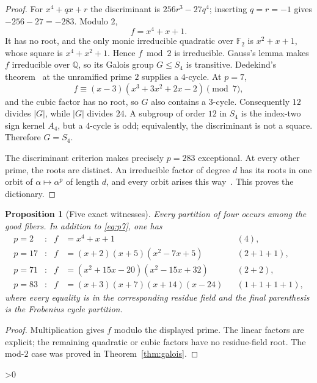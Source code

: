 \documentclass[10pt]{article}
\providecommand{\CRevisionRound}{2}
\newtheorem{proposition}{Proposition}
\begin{document}
\begin{proof}
For $x^4+qx+r$ the discriminant is $256r^3-27q^4$; inserting $q=r=-1$
gives $-256-27=-283$.  Modulo $2$,
\[
 f=x^4+x+1.
\]
It has no root, and the only monic irreducible quadratic over $\mathbb F_2$
is $x^2+x+1$, whose square is $x^4+x^2+1$.  Hence $f\bmod2$ is
irreducible.  Gauss's lemma makes $f$ irreducible over $\mathbb Q$, so its
Galois group $G\le S_4$ is transitive.  Dedekind's theorem~\cite{Serre,Neukirch} at the
unramified prime $2$ supplies a $4$-cycle.  At $p=7$,
\begin{equation}\label{eq:p7}
 f\equiv(x-3)(x^3+3x^2+2x-2)\pmod 7,
\end{equation}
and the cubic factor has no root, so $G$ also contains a $3$-cycle.
Consequently $12$ divides $|G|$, while $|G|$ divides $24$.  A subgroup of
order $12$ in $S_4$ is the index-two sign kernel $A_4$, but a $4$-cycle is
odd; equivalently, the discriminant is not a square.  Therefore $G=S_4$.

The discriminant criterion makes precisely $p=283$ exceptional.
At every other prime, the roots are distinct.  An irreducible factor of
degree $d$ has its roots in one orbit of $\alpha\mapsto\alpha^p$ of length
$d$, and every orbit arises this way~\cite{Lidl}.  This proves the dictionary.
\end{proof}

\begin{proposition}[Five exact witnesses]\label{prop:witnesses}
Every partition of four occurs among the good fibers.  In addition to
\eqref{eq:p7}, one has
\begin{align*}
 p=2 &: & f&=x^4+x+1 &&(4),\\
 p=17&: & f&=(x+2)(x+5)(x^2-7x+5) &&(2+1+1),\\
 p=71&: & f&=(x^2+15x-20)(x^2-15x+32) &&(2+2),\\
 p=83&: & f&=(x+3)(x+7)(x+14)(x-24) &&(1+1+1+1),
\end{align*}
where every equality is in the corresponding residue field and the final
parenthesis is the Frobenius cycle partition.
\end{proposition}

\begin{proof}
Multiplication gives $f$ modulo the displayed prime.  The linear factors
are explicit; the remaining quadratic or cubic factors have no residue-field
root.  The mod-$2$ case was proved in Theorem~\ref{thm:galois}.
\end{proof}

\ifnum\CRevisionRound>0
\end{document}
